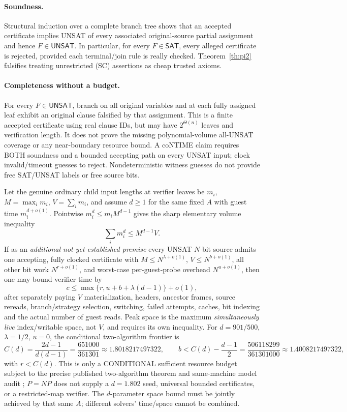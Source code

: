 \documentclass[11pt]{article}
\newcommand{\SAT}{\mathsf{SAT}}
\newcommand{\UNSAT}{\mathsf{UNSAT}}
\begin{document}
\paragraph{Soundness.} Structural induction over a complete branch tree shows that an accepted certificate implies UNSAT of every associated original-source partial assignment and hence $F\in\UNSAT$. In particular, for every $F\in\SAT$, every alleged certificate is rejected, provided each terminal/join rule is really checked. Theorem~\ref{th:pi2} falsifies treating unrestricted (SC) assertions as cheap trusted axioms.

\paragraph{Completeness without a budget.} For every $F\in\UNSAT$, branch on all original variables and at each fully assigned leaf exhibit an original clause falsified by that assignment. This is a finite accepted certificate using real clause IDs, but may have $2^{\Theta(n)}$ leaves and verification length. It does not prove the missing polynomial-volume all-UNSAT coverage or any near-boundary resource bound. A coNTIME claim requires BOTH soundness and a bounded accepting path on every UNSAT input; clock invalid/timeout guesses to reject. Nondeterministic witness guesses do not provide free SAT/UNSAT labels or free source bits.

Let the genuine ordinary child input lengths at verifier leaves be $m_i$, $M=\max_i m_i$, $V=\sum_i m_i$, and assume $d\ge1$ for the same fixed $A$ with guest time $m_i^{d+o(1)}$. Pointwise $m_i^{d}\le m_i M^{d-1}$ gives the sharp elementary volume inequality
\[
\boxed{\sum_i m_i^d\le M^{d-1}V.}\tag{VOL}
\]
If as an \emph{additional not-yet-established premise} every UNSAT $N$-bit source admits one accepting, fully clocked certificate with $M\le N^{\lambda+o(1)}$, $V\le N^{b+o(1)}$, all other bit work $N^{r+o(1)}$, and worst-case per-guest-probe overhead $N^{u+o(1)}$, then one may bound verifier time by
\[
c\le\max\{r,u+b+\lambda(d-1)\}+o(1),
\]
after separately paying $V$ materialization, headers, ancestor frames, source rereads, branch/strategy selection, switching, failed attempts, caches, bit indexing and the actual number of guest reads. Peak space is the maximum \emph{simultaneously live} index/writable space, not $V$, and requires its own inequality. For $d=901/500$, $\lambda=1/2$, $u=0$, the conditional two-algorithm frontier is
\[
C(d)=\frac{2d-1}{d(d-1)}=\frac{651000}{361301}
\approx1.8018217497322,\qquad
b<C(d)-\frac{d-1}{2}=\frac{506118299}{361301000}\approx1.4008217497322,
\]
with $r<C(d)$. This is only a CONDITIONAL sufficient resource budget subject to the precise published two-algorithm theorem and same-machine model audit \cite{VM}; $P=NP$ does not supply a $d=1.802$ seed, universal bounded certificates, or a restricted-map verifier. The $d$-parameter space bound must be jointly achieved by that same $A$; different solvers' time/space cannot be combined.
\end{document}
